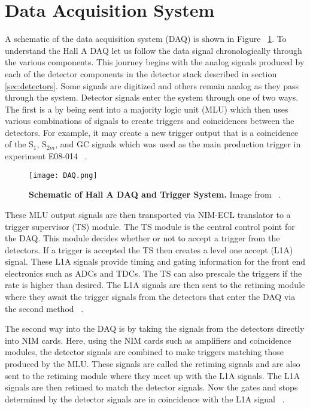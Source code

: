 \section{Data Acquisition System}
\label{sec:daq}

A schematic of the data acquisition system (DAQ) is shown in Figure ~\ref{fig:daq}. To understand the Hall A DAQ let us follow the data signal chronologically through the various components. This journey begins with the analog signals produced by each of the detector components in the detector stack described in section \ref{sec:detectors}. Some signals are digitized and others remain analog as they pass through the system. Detector signals enter the system through one of two ways. The first is a by being sent into a majority logic unit (MLU) which then uses various combinations of signals to create triggers and coincidences between the detectors. For example, it may create a new trigger output that is a coincidence of the S$_1$, S$_{2m}$, and GC signals which was used as the main production trigger in experiment E08-014 ~\cite{DAQ}. 

\begin{figure}[!ht]
\begin{center}
\texttt{[image: DAQ.png]}
\end{center}
\caption[Schematic of Hall A DAQ and Trigger System]{
{\bf{Schematic of Hall A DAQ and Trigger System.}} Image from ~\cite{DAQ}.}
\label{fig:daq}
\end{figure}

These MLU output signals are then transported via NIM-ECL translator to a trigger supervisor (TS) module. The TS module is the central control point for the DAQ. This module decides whether or not to accept a trigger from the detectors. If a trigger is accepted the TS then creates a level one accept (L1A) signal. These L1A signals provide timing and gating information for the front end electronics such as ADCs and TDCs. The TS can also prescale the triggers if the rate is higher than desired. The L1A signals are then sent to the retiming module where they await the trigger signals from the detectors that enter the DAQ via the second method ~\cite{DAQ}.

The second way into the DAQ is by taking the signals from the detectors directly into NIM cards. Here, using the NIM cards such as amplifiers and coincidence modules, the detector signals are combined to make triggers matching those produced by the MLU. These signals are called the retiming signals and are also sent to the retiming module where they meet up with the L1A signals. The L1A signals are then retimed to match the detector signals. Now the gates and stops determined by the detector signals are in coincidence with the L1A signal ~\cite{DAQ}.

